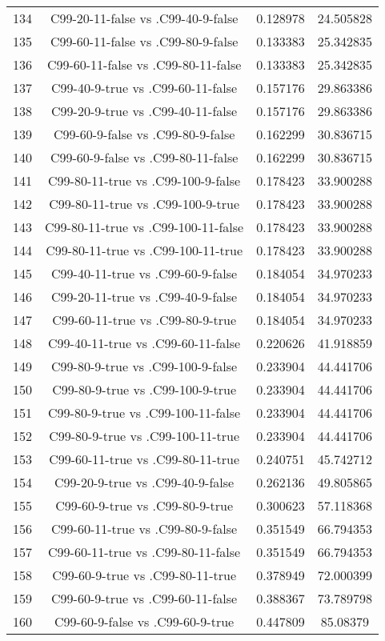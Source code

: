 \documentclass[a4paper,10pt]{article}
\begin{document}
\begin{landscape}
\begin{table}[!htp]
\begin{tabular}{cccc}
134&C99-20-11-false vs .C99-40-9-false&0.128978&24.505828\\
135&C99-60-11-false vs .C99-80-9-false&0.133383&25.342835\\
136&C99-60-11-false vs .C99-80-11-false&0.133383&25.342835\\
137&C99-40-9-true vs .C99-60-11-false&0.157176&29.863386\\
138&C99-20-9-true vs .C99-40-11-false&0.157176&29.863386\\
139&C99-60-9-false vs .C99-80-9-false&0.162299&30.836715\\
140&C99-60-9-false vs .C99-80-11-false&0.162299&30.836715\\
141&C99-80-11-true vs .C99-100-9-false&0.178423&33.900288\\
142&C99-80-11-true vs .C99-100-9-true&0.178423&33.900288\\
143&C99-80-11-true vs .C99-100-11-false&0.178423&33.900288\\
144&C99-80-11-true vs .C99-100-11-true&0.178423&33.900288\\
145&C99-40-11-true vs .C99-60-9-false&0.184054&34.970233\\
146&C99-20-11-true vs .C99-40-9-false&0.184054&34.970233\\
147&C99-60-11-true vs .C99-80-9-true&0.184054&34.970233\\
148&C99-40-11-true vs .C99-60-11-false&0.220626&41.918859\\
149&C99-80-9-true vs .C99-100-9-false&0.233904&44.441706\\
150&C99-80-9-true vs .C99-100-9-true&0.233904&44.441706\\
151&C99-80-9-true vs .C99-100-11-false&0.233904&44.441706\\
152&C99-80-9-true vs .C99-100-11-true&0.233904&44.441706\\
153&C99-60-11-true vs .C99-80-11-true&0.240751&45.742712\\
154&C99-20-9-true vs .C99-40-9-false&0.262136&49.805865\\
155&C99-60-9-true vs .C99-80-9-true&0.300623&57.118368\\
156&C99-60-11-true vs .C99-80-9-false&0.351549&66.794353\\
157&C99-60-11-true vs .C99-80-11-false&0.351549&66.794353\\
158&C99-60-9-true vs .C99-80-11-true&0.378949&72.000399\\
159&C99-60-9-true vs .C99-60-11-false&0.388367&73.789798\\
160&C99-60-9-false vs .C99-60-9-true&0.447809&85.08379\\

\end{tabular}
\end{table}
\end{landscape}
\end{document}

